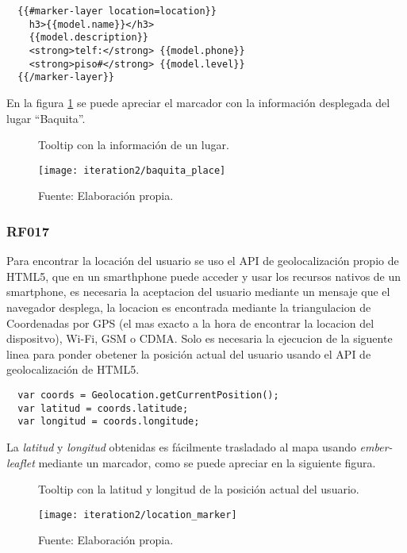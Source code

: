 \begin{verbatim}
  {{#marker-layer location=location}}
    h3>{{model.name}}</h3>
    {{model.description}}
    <strong>telf:</strong> {{model.phone}}
    <strong>piso#</strong> {{model.level}}
  {{/marker-layer}}
\end{verbatim}

En la figura \ref{fig:baquita_place} se puede apreciar el marcador con la información desplegada del lugar ``Baquita''.

\begin{figure}[H]
  \begin{center}
    \caption{Tooltip con la información de un lugar.}
    \label{fig:baquita_place}
    \texttt{[image: iteration2/baquita\_place]}
    \caption*{Fuente: Elaboración propia.}
  \end{center}
\end{figure}


\subsubsection{RF017}
\label{subs:RF017}

Para encontrar la locación del usuario se uso el API de geolocalización propio de HTML5, que en un smarthphone puede acceder y usar los recursos nativos de un smartphone, es necesaria la aceptacion del usuario mediante un mensaje que el navegador desplega, la locacion es encontrada mediante la triangulacion de Coordenadas por GPS (el mas exacto a la hora de encontrar la locacion del dispositvo), Wi-Fi, GSM o CDMA. Solo es necesaria la ejecucion de la siguente linea para ponder obetener la posición actual del usuario usando el API de geolocalización de HTML5.

\begin{verbatim}
  var coords = Geolocation.getCurrentPosition();
  var latitud = coords.latitude;
  var longitud = coords.longitude;
\end{verbatim}

La \emph{latitud} y \emph{longitud} obtenidas es fácilmente trasladado al mapa usando \emph{ember-leaflet} mediante un marcador, como se puede apreciar en la siguiente figura.

\begin{figure}[H]
  \begin{center}
    \caption{Tooltip con la latitud y longitud de la posición actual del usuario.}
    \label{fig:location_marker}
    \texttt{[image: iteration2/location\_marker]}
    \caption*{Fuente: Elaboración propia.}
  \end{center}
\end{figure}

